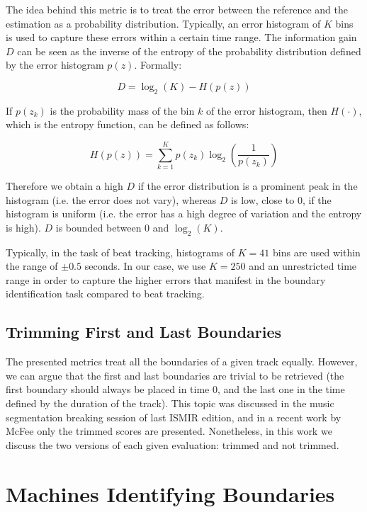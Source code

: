 \documentclass{article}
\begin{document}
The idea behind this metric is to treat the error between the reference and the estimation as a probability distribution.
Typically, an error histogram of $K$ bins is used to capture these errors within a certain time range.
The information gain $D$ can be seen as the inverse of the entropy of the probability distribution defined by the error histogram $p(z)$. Formally:

\begin{equation}
  D = \log_2(K) - H(p(z))
\end{equation}

If $p(z_k)$ is the probability mass of the bin $k$ of the error histogram, then $H(\cdot)$, which is the entropy function, can be defined as follows:

\begin{equation}
  H(p(z)) = \sum_{k=1}^K p(z_k) \log_2 \left( \frac{1}{p(z_k)} \right)
\end{equation}

Therefore we obtain a high $D$ if the error distribution is a prominent peak in the histogram (i.e. the error does not vary), whereas $D$ is low, close to 0, if the histogram is uniform (i.e. the error has a high degree of variation and the entropy is high).
$D$ is bounded between 0 and $\log_2(K)$.

Typically, in the task of beat tracking, histograms of $K=41$ bins are used within the range of $\pm0.5$ seconds.
In our case, we use $K=250$ and an unrestricted time range in order to capture the higher errors that manifest in the boundary identification task compared to beat tracking.

\subsection{Trimming First and Last Boundaries}

The presented metrics treat all the boundaries of a given track equally. 
However, we can argue that the first and last boundaries are trivial to be retrieved (the first boundary should always be placed in time 0, and the last one in the time defined by the duration of the track). 
This topic was discussed in the music segmentation breaking session of last ISMIR edition\cite{Nieto2013}, and in a recent work by McFee only the trimmed scores are presented\cite{McFee2014}. 
Nonetheless, in this work we discuss the two versions of each given evaluation: trimmed and not trimmed.

\section{Machines Identifying Boundaries}\label{sec:eval_desc}
\end{document}
